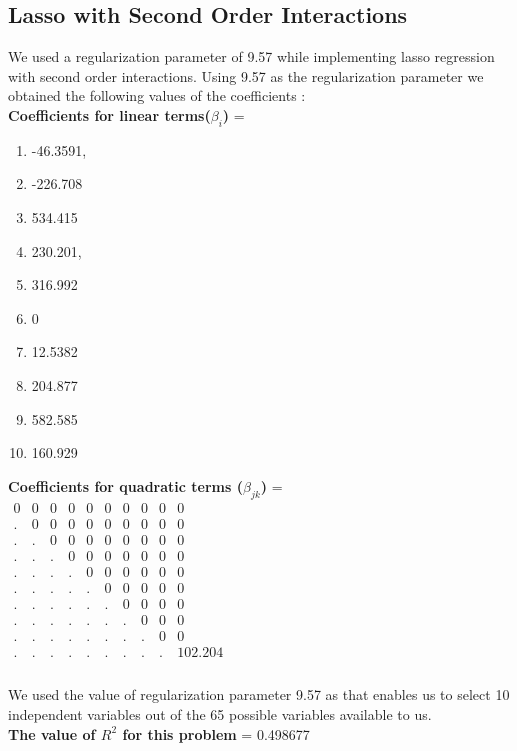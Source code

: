 \documentclass[15pt,a4paper,openright]{article}
\begin{document}
\subsection{Lasso with Second Order Interactions}
We used a regularization parameter of 9.57 while implementing lasso regression with second order interactions. 
Using 9.57 as the regularization parameter we obtained the following values of the coefficients :
\\\textbf{Coefficients for linear terms($\beta_{i}$)} = 
\begin{enumerate}
    \item -46.3591,
\item -226.708
\item 534.415 
\item 230.201, 
\item 316.992
\item 0
\item 12.5382
\item 204.877
\item 582.585
\item 160.929
\end{enumerate}

\textbf{Coefficients for quadratic terms ($\beta_{jk}$)} = 
\\$\begin{matrix}
0&0&0&0&0&0&0&0&0&0\\
.&0&0&0&0&0&0&0&0&0\\
.&.&0&0&0&0&0&0&0&0\\
.&.&.&0&0&0&0&0&0&0\\
.&.&.&.&0&0&0&0&0&0\\
.&.&.&.&.&0&0&0&0&0\\
.&.&.&.&.&.&0&0&0&0\\
.&.&.&.&.&.&.&0&0&0\\
.&.&.&.&.&.&.&.&0&0\\
.&.&.&.&.&.&.&.&.&102.204\\
\end{matrix}$
\\\\We used the value of regularization parameter 9.57 as that enables us to select 10 independent variables out of the 65 possible variables available to us.
\\\textbf{The value of $R^{2}$ for this problem} = 0.498677
\newpage{}
\end{document}
